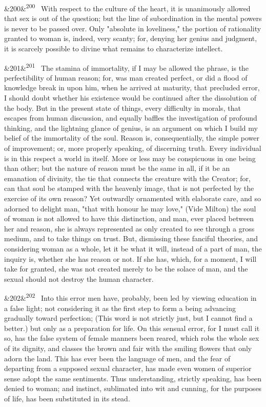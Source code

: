 \documentclass[12pt]{article}
\newcommand{\para}[1][]{\par\noindent\ifx&#1&\else\textsuperscript{\footnotesize #1}~\fi}
\begin{document}
\para[200] With respect to the culture of the heart, it is unanimously allowed that sex is out of the question; but the line of subordination in the mental powers is never to be passed over. Only "absolute in loveliness," the portion of rationality granted to woman is, indeed, very scanty; for, denying her genius and judgment, it is scarcely possible to divine what remains to characterize intellect.

\para[201] The stamina of immortality, if I may be allowed the phrase, is the perfectibility of human reason; for, was man created perfect, or did a flood of knowledge break in upon him, when he arrived at maturity, that precluded error, I should doubt whether his existence would be continued after the dissolution of the body. But in the present state of things, every difficulty in morals, that escapes from human discussion, and equally baffles the investigation of profound thinking, and the lightning glance of genius, is an argument on which I build my belief of the immortality of the soul. Reason is, consequentially, the simple power of improvement; or, more properly speaking, of discerning truth. Every individual is in this respect a world in itself. More or less may be conspicuous in one being than other; but the nature of reason must be the same in all, if it be an emanation of divinity, the tie that connects the creature with the Creator; for, can that soul be stamped with the heavenly image, that is not perfected by the exercise of its own reason? Yet outwardly ornamented with elaborate care, and so adorned to delight man, "that with honour he may love," (Vide Milton) the soul of woman is not allowed to have this distinction, and man, ever placed between her and reason, she is always represented as only created to see through a gross medium, and to take things on trust. But, dismissing these fanciful theories, and considering woman as a whole, let it be what it will, instead of a part of man, the inquiry is, whether she has reason or not. If she has, which, for a moment, I will take for granted, she was not created merely to be the solace of man, and the sexual should not destroy the human character.

\para[202] Into this error men have, probably, been led by viewing education in a false light; not considering it as the first step to form a being advancing gradually toward perfection; (This word is not strictly just, but I cannot find a better.) but only as a preparation for life. On this sensual error, for I must call it so, has the false system of female manners been reared, which robs the whole sex of its dignity, and classes the brown and fair with the smiling flowers that only adorn the land. This has ever been the language of men, and the fear of departing from a supposed sexual character, has made even women of superior sense adopt the same sentiments. Thus understanding, strictly speaking, has been denied to woman; and instinct, sublimated into wit and cunning, for the purposes of life, has been substituted in its stead.
\end{document}
